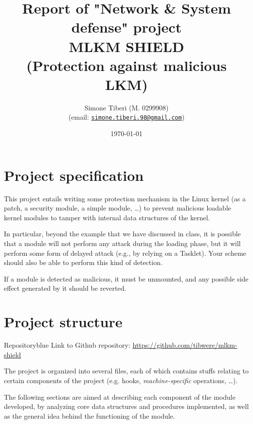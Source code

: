 \documentclass{article}
\title{\small Report of "Network \& System defense" project \\
\Huge \textbf{MLKM SHIELD}\\
\Large (Protection against malicious LKM)}
\author{Simone Tiberi (M. 0299908)\\%
(email: \texttt{\href{mailto:simone.tiberi.98@gmail.com}{simone.tiberi.98@gmail.com}})}
\date{\today}
\begin{document}
	\maketitle
	\tableofcontents
	\newpage

	\section{Project specification}
	This project entails writing some protection mechanism in the Linux kernel (as a patch, a security module, a simple
	module, \dots) to prevent malicious loadable kernel modules to tamper with internal data structures of the kernel.

	In particular, beyond the example that we have discussed in class, it is possible that a module will not perform
	any attack during the loading phase, but it will perform some form of delayed attack (e.g., by relying on a
	Tasklet). Your scheme should also be able to perform this kind of detection.

	If a module is detected as malicious, it must be unmounted, and any possible side effect generated by it should be
	reverted.

	\section{Project structure}
	\begin{custombox}{Repository}{blue}
		Link to Github repository: \url{https://github.com/tibwere/mlkm-shield}
	\end{custombox}

	The project is organized into several files, each of which contains stuffs relating to certain components of the
	project (e.g. hooks, \textit{machine-specific} operations, \dots).

	The following sections are aimed at describing each component of the module developed, by analyzing core data
	structures and procedures implemented, as well as the general idea behind the functioning of the module.
\end{document}
